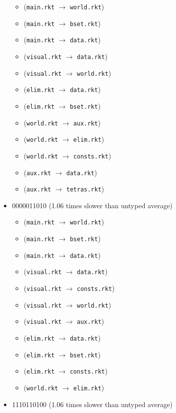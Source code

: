 \documentclass{article}
\newcommand{\mono}[1]{\texttt{#1}}
\begin{document}
\begin{itemize}
\begin{itemize}
  \item (\mono{main.rkt} $\rightarrow$ \mono{world.rkt})
  \item (\mono{main.rkt} $\rightarrow$ \mono{bset.rkt})
  \item (\mono{main.rkt} $\rightarrow$ \mono{data.rkt})
  \item (\mono{visual.rkt} $\rightarrow$ \mono{data.rkt})
  \item (\mono{visual.rkt} $\rightarrow$ \mono{world.rkt})
  \item (\mono{elim.rkt} $\rightarrow$ \mono{data.rkt})
  \item (\mono{elim.rkt} $\rightarrow$ \mono{bset.rkt})
  \item (\mono{world.rkt} $\rightarrow$ \mono{aux.rkt})
  \item (\mono{world.rkt} $\rightarrow$ \mono{elim.rkt})
  \item (\mono{world.rkt} $\rightarrow$ \mono{consts.rkt})
  \item (\mono{aux.rkt} $\rightarrow$ \mono{data.rkt})
  \item (\mono{aux.rkt} $\rightarrow$ \mono{tetras.rkt})
  \end{itemize}
\item 0000011010 (1.06 times slower than untyped average)
  \begin{itemize}
  \item (\mono{main.rkt} $\rightarrow$ \mono{world.rkt})
  \item (\mono{main.rkt} $\rightarrow$ \mono{bset.rkt})
  \item (\mono{main.rkt} $\rightarrow$ \mono{data.rkt})
  \item (\mono{visual.rkt} $\rightarrow$ \mono{data.rkt})
  \item (\mono{visual.rkt} $\rightarrow$ \mono{consts.rkt})
  \item (\mono{visual.rkt} $\rightarrow$ \mono{world.rkt})
  \item (\mono{visual.rkt} $\rightarrow$ \mono{aux.rkt})
  \item (\mono{elim.rkt} $\rightarrow$ \mono{data.rkt})
  \item (\mono{elim.rkt} $\rightarrow$ \mono{bset.rkt})
  \item (\mono{elim.rkt} $\rightarrow$ \mono{consts.rkt})
  \item (\mono{world.rkt} $\rightarrow$ \mono{elim.rkt})
  \end{itemize}
\item 1110110100 (1.06 times slower than untyped average)
  \begin{itemize}

\end{itemize}
\end{itemize}
\end{document}
